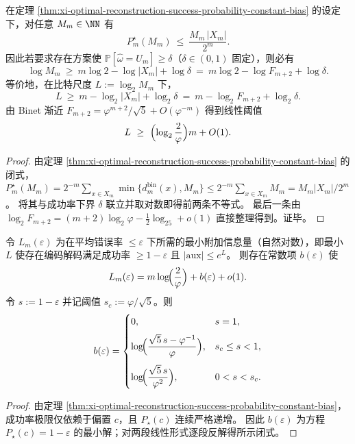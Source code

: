 \begin{corollary}[基数预算的强反界与线性阈值斜率]\label{cor:xi-reconstruction-cardinality-strong-converse}
在定理 \ref{thm:xi-optimal-reconstruction-success-probability-constant-bias} 的设定下，对任意 \(M_m\in\NN\) 有
\[
P_m^\star(M_m)\ \le\ \frac{M_m\,|X_m|}{2^m}.
\]
因此若要求存在方案使 \(\mathbb P[\widehat\omega=U_m]\ge \delta\)（\(\delta\in(0,1)\) 固定），则必有
\[
\log M_m\ \ge\ m\log 2-\log|X_m|+\log\delta
\ =\ m\log 2-\log F_{m+2}+\log\delta.
\]
等价地，在比特尺度 \(L:=\log_2 M_m\) 下，
\[
L\ \ge\ m-\log_2|X_m|+\log_2\delta
\ =\ m-\log_2F_{m+2}+\log_2\delta.
\]
由 Binet 渐近 \(F_{m+2}=\varphi^{m+2}/\sqrt5+O(\varphi^{-m})\) 得到线性阈值
\[
L\ \ge\ \Bigl(\log_2\frac{2}{\varphi}\Bigr)m+O(1).
\]
\end{corollary}
\begin{proof}
由定理 \ref{thm:xi-optimal-reconstruction-success-probability-constant-bias} 的闭式，
\(
P_m^\star(M_m)=2^{-m}\sum_{x\in X_m}\min\{d_m^{\mathrm{bin}}(x),M_m\}
\le 2^{-m}\sum_{x\in X_m}M_m
=M_m|X_m|/2^m
\)。
将其与成功率下界 \(\delta\) 联立并取对数即得前两条不等式。
最后一条由 \(\log_2F_{m+2}=(m+2)\log_2\varphi-\frac12\log_25+o(1)\) 直接整理得到。证毕。
\end{proof}

\begin{corollary}\label{cor:xi-constant-bias-inversion-b-eps}
令 \(L_m(\varepsilon)\) 为在平均错误率 \(\le\varepsilon\) 下所需的最小附加信息量（自然对数），即最小 \(L\) 使存在编码解码满足成功率 \(\ge 1-\varepsilon\) 且 \(|\mathrm{aux}|\le e^{L}\)。
则存在常数项 \(b(\varepsilon)\) 使
\[
L_m(\varepsilon)=m\log\!\Bigl(\frac{2}{\varphi}\Bigr)+b(\varepsilon)+o(1).
\]
令 \(s:=1-\varepsilon\) 并记阈值 \(s_c:=\varphi/\sqrt5\)。则
\[
b(\varepsilon)=
\begin{cases}
0, & s=1,\\[6pt]
\displaystyle \log\!\Bigl(\frac{\sqrt5\,s-\varphi^{-1}}{\varphi}\Bigr), & s_c\le s<1,\\[12pt]
\displaystyle \log\!\Bigl(\frac{\sqrt5\,s}{\varphi^2}\Bigr), & 0<s<s_c.
\end{cases}
\]
\end{corollary}

\begin{proof}
由定理 \ref{thm:xi-optimal-reconstruction-success-probability-constant-bias}，成功率极限仅依赖于偏置 \(c\)，且 \(P_\star(c)\) 连续严格递增。
因此 \(b(\varepsilon)\) 为方程 \(P_\star(c)=1-\varepsilon\) 的最小解；对两段线性形式逐段反解得所示闭式。
\end{proof}


